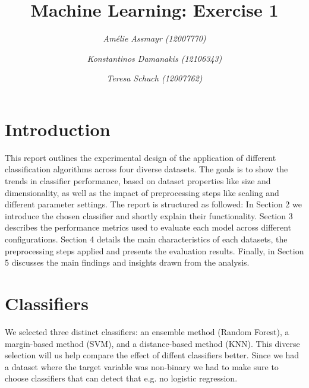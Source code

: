 \documentclass{article}
\title{\textbf{Machine Learning: Exercise 1}}
\author{\textit{Amélie Assmayr (12007770)} \and
        \textit{Konstantinos Damanakis (12106343)} \and
        \textit{Teresa Schuch (12007762)}}
\date{}
\begin{document}
\maketitle
\vspace{-20pt}



\section{Introduction}
This report outlines the experimental design of the application of different classification algorithms across four diverse datasets. The goals is to show the trends in classifier performance, based on dataset properties like size and dimensionality, as well as the impact of preprocessing steps like scaling and different parameter settings.
The report is structured as followed: In Section 2 we introduce the chosen classifier and shortly explain their functionality. Section 3 describes the performance metrics used to evaluate each model across different configurations. Section 4 details the main characteristics of each datasets, the preprocessing steps applied and presents the evaluation results. Finally, in Section 5 discusses the main findings and insights drawn from the analysis.



\section{Classifiers}
We selected three distinct classifiers: an ensemble method (Random Forest), a margin-based method (SVM), and a distance-based method (KNN). This diverse selection will us help compare the effect of diffent classifiers better. Since we had a dataset where the target variable was non-binary we had to make sure to choose classifiers that can detect that e.g. no logistic regression. 
\end{document}
